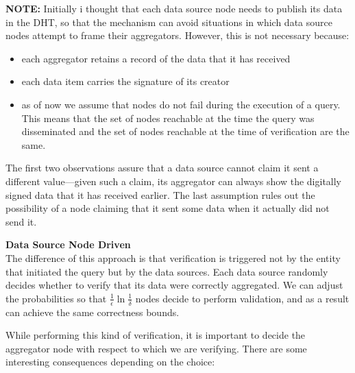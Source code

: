 \documentclass{article}
\begin{document}
{\bf NOTE:} Initially i thought that each data source node needs to
publish its data in the DHT, so that the mechanism can avoid
situations in which data source nodes attempt to frame their
aggregators. However, this is not necessary because:

\begin{itemize}
\item each aggregator retains a record of the data that it has
  received
\item each data item carries the signature of its creator

\item as of now we assume that nodes do not fail during the execution
  of a query. This means that the set of nodes reachable at the time the
  query was disseminated and the set of nodes reachable at the time of
  verification are the same.
\end{itemize} 

The first two observations assure that a data source cannot claim it
sent a different value---given such a claim, its aggregator can always
show the digitally signed data that it has received earlier. The last
assumption rules out the possibility of a node claiming that
it sent some data when it actually did not send it.


{\bf Data Source Node Driven}\\
The difference of this approach is that verification is triggered not
by the entity that initiated the query but by the data sources. Each
data source randomly decides whether to verify that its data were
correctly aggregated. We can adjust the probabilities so that
$\frac{1}{\epsilon}\ln{\frac{1}{\delta}}$ nodes decide to perform
validation, and as a result can achieve the same correctness bounds.

While performing this kind of verification, it is important to decide
the aggregator node with respect to which we are verifying. There are
some interesting consequences depending on the choice:
\end{document}
